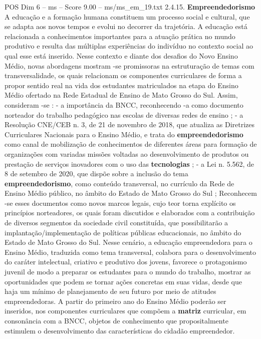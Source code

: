 \begin{textsample}{POS Dim 6 – ms – Score 9.00 – ms/ms\_em\_19.txt}  \label{ex:f6_pos_057}
2.4.15. \textbf{Empreendedorismo} A educação e a formação humana constituem um processo social e cultural, que se adapta aos novos tempos e evolui no decorrer da trajetória.
A educação está relacionada a conhecimentos importantes para a atuação prática no mundo produtivo e resulta das múltiplas experiências do indivíduo no contexto social ao qual esse está inserido.
Nesse contexto e diante dos desafios do Novo Ensino Médio, novas abordagens mostram -se promissoras na estruturação de temas com transversalidade, os quais relacionam os componentes curriculares de forma a propor sentido real na vida dos estudantes matriculados na etapa do Ensino Médio ofertado na Rede Estadual de Ensino de Mato Grosso do Sul.
Assim, consideram -se : - a importância da BNCC, reconhecendo -a como documento norteador do trabalho pedagógico nas escolas de diversas redes de ensino ; - a Resolução CNE/CEB n. 3, de 21 de novembro de 2018, que atualiza as Diretrizes Curriculares Nacionais para o Ensino Médio, e trata do \textbf{empreendedorismo} como canal de mobilização de conhecimentos de diferentes áreas para formação de organizações com variadas missões voltadas ao desenvolvimento de produtos ou prestação de serviços inovadores com o uso das \textbf{tecnologias} ; - a Lei n. 5.562, de 8 de setembro de 2020, que dispõe sobre a inclusão do tema \textbf{empreendedorismo}, como conteúdo transversal, no currículo da Rede de Ensino Médio público, no âmbito do Estado de Mato Grosso do Sul ; Reconhecem -se esses documentos como novos marcos legais, cujo teor torna explícito os princípios norteadores, os quais foram discutidos e elaborados com a contribuição de diversos segmentos da sociedade civil constituída, que possibilitarão a implantação/implementação de políticas públicas educacionais, no âmbito do Estado de Mato Grosso do Sul.
Nesse cenário, a educação empreendedora para o Ensino Médio, traduzida como tema transversal, colabora para o desenvolvimento do caráter intelectual, criativo e produtivo dos jovens, favorece o protagonismo juvenil de modo a preparar os estudantes para o mundo do trabalho, mostrar as oportunidades que podem se tornar ações concretas em suas vidas, desde que haja um mínimo de planejamento de seu futuro por meio de atitudes empreendedoras.
A partir do primeiro ano do Ensino Médio poderão ser inseridos, nos componentes curriculares que compõem a \textbf{matriz} curricular, em consonância com a BNCC, objetos de conhecimento que propositalmente estimulem o desenvolvimento das características do cidadão empreendedor.

\end{textsample}
